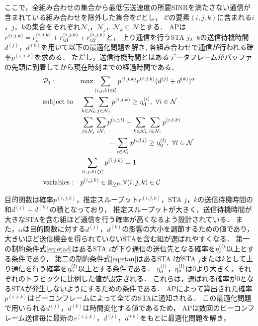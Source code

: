 \documentclass[technicalreport]{ieicej}
\newcommand{\sijk}{(i,j,k)}
\newcommand{\pijk}{p^{(i,j,k)}}
\newcommand{\rijk}{r^{(i,j,k)}}
\newcommand{\mthc}{\mathcal C}
\newcommand{\mthni}{{\mathcal N}_i}
\newcommand{\mthnj}{{\mathcal N}_j}
\newcommand{\mthnk}{{\mathcal N}_k}
\begin{document}
		ここで，全組み合わせの集合から最低伝送速度の所要SINRを満たさない通信が含まれている組み合わせを除外した集合を$\mthc$とし，
		$\mthc$の要素$\sijk$に含まれる$i$，$j$，$k$の集合をそれぞれ$\mthni$，$\mthnj$，$\mthnk\subseteq{\mathcal N}$とする．
		APは$\rijk=r^{(i,j,k)}_{\rm d}+r^{(i,j,k)}_{\rm u1}+r^{(i,j,k)}_{\rm u2}$と，
		上り通信を行うSTA $j$，$k$の送信待機時間$d^{(j)}$，$d^{(k)}$を用いて以下の最適化問題を解き,
		各組み合わせで通信が行われる確率$p^{(i,j,k)}$を求める．
		ただし，送信待機時間とはあるデータフレームがバッファの先頭に到着してから現在時刻までの経過時間である．
		\begin{align}
			&{\mathcal P}_1: && {\rm max} \sum_{(i,j,k)\in{\mathcal C}} p^{(i,j,k)}r^{(i,j,k)}(d^{(j)}+d^{(k)})^{\alpha} &&&&&&\\
			&{\rm subject\ to} && \sum_{k\in\mthnk} \sum_{j\in\mthnj} p^{(i,j,k)} \geq \eta_{\rm d}^{(i)},\ \forall i\in {\mathcal N} \label{eq:etad} \\
			&&& \sum_{j\in\mthnj} \sum_{i\mthni} p^{(i,j,l)}+\sum_{k\in\mthnk} \sum_{i\in\mthni} p^{(i,l,k)} \nonumber\\
			&&&\qquad\qquad- \sum_{i\in\mthni} p^{(i,l,l)} \geq \eta_{\rm u}^{(l)},\ \forall l\in {\mathcal N} \label{eq:etau} \\
			&&& \sum_{(i,j,k)\in{\mathcal C}} p^{(i,j,k)}=1 \\
			&{\rm variables:} &&p^{(i,j,k)} \in {\mathbb R}_{\geq 0},\forall(i,j,k)\in {\mathcal C}
		\end{align}
		\par
		目的関数は確率$\pijk$，推定スループット$\rijk$，STA $j$，$k$の送信待機時間の和$d^{(j)}+d^{(k)}$の積となっており，
		推定スループットが大きく，送信待機時間が大きなSTAを含む組ほど通信を行う確率が高くなるよう設計されている．
		また，$\alpha$は目的関数に対する$d^{(j)}$，$d^{(k)}$の影響の大小を調節するための値であり，
		大きいほど送信機会を得られていないSTAを含む組が選ばれやすくなる．
		第一の制約条件式\eqref{eq:etad}はあるSTA $i$が下り通信の送信先となる確率を$\eta_{\rm d}^{(i)}$以上とする条件であり，
		第二の制約条件式\eqref{eq:etau}はあるSTA $l$がSTA $j$または$k$として上り通信を行う確率を$\eta_{\rm u}^{(l)}$以上とする条件である．
		$\eta_{\rm d}^{(i)}$，$\eta_{\rm u}^{(l)}$は0より大きく，それぞれのトラヒックに比例した値が設定される．
		これらは，選ばれる確率が0となるSTAが発生しないようにするための条件である．
		APによって算出された確率$\pijk$はビーコンフレームによって全てのSTAに通知される．
		この最適化問題で用いられる$d^{(j)}$，$d^{(k)}$は時間変化する値であるため，
		APは数回のビーコンフレーム送信毎に最新の$\rijk$，$d^{(j)}$，$d^{(k)}$をもとに最適化問題を解き，
\end{document}
